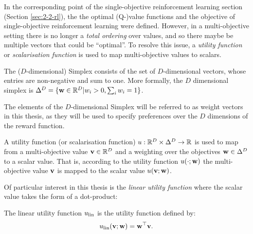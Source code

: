     In the corresponding point of the single-objective reinforcement learning section (Section \ref{sec:2-2-rl}), the the optimal (Q-)value functions and the objective of single-objective reinforcement learning were defined. However, in a multi-objective setting there is no longer a \textit{total ordering} over values, and so there maybe be multiple vectors that could be ``optimal''. To resolve this issue, a \textit{utility function} or \textit{scalarisation function} is used to map multi-objective values to scalars.

    \begin{defn}
        \label{def:simplex}
        \label{def:weight}
        \label{def:context}
        The \textnormal{($D$-dimensional) Simplex} consists of the set of $D$-dimensional vectors, whose entries are non-negative and sum to one. More formally, the $D$ dimensional simplex is $\Delta^D = \{\mathbf{w}\in\mathbb{R}^D|w_i > 0, \sum_i w_i = 1\}$.

        The elements of the $D$-dimensional Simplex will be referred to as \textnormal{weight vectors} in this thesis, as they will be used to specify preferences over the $D$ dimensions of the reward function.
    \end{defn}

    \begin{defn}
        \label{def:utility_fn}
        \label{def:scalarisation_fn}
        A \textnormal{utility function} (or \textnormal{scalarisation function}) $u:\mathbb{R}^D\times\Delta^D \rightarrow \mathbb{R}$ is used to map from a multi-objective value $\mathbf{v}\in\mathbb{R}^D$ and a weighting over the objectives $\mathbf{w}\in\Delta^D$ to a scalar value. That is, according to the utility function $u(\cdot;\mathbf{w})$ the multi-objective value $\mathbf{v}$ is mapped to the scalar value $u(\mathbf{v};\mathbf{w})$.
    \end{defn}

    Of particular interest in this thesis is the \textit{linear utility function} where the scalar value takes the form of a dot-product:
    \begin{defn}
        \label{def:linear_utility_fn}
        \label{def:linear_scalarisation_fn}
        The \textnormal{linear utility function} $u_{{\textnormal{lin}}}$ is the utility function defined by:
        \begin{align}
            u_{{\textnormal{lin}}}(\mathbf{v};\mathbf{w}) = \mathbf{w}^\top \mathbf{v}.
        \end{align}
    \end{defn}

